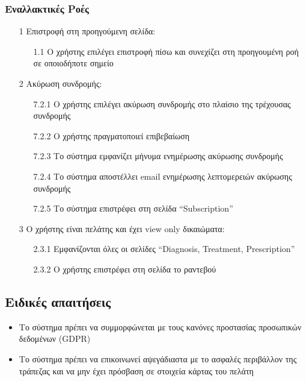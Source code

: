 \documentclass[12pt,a4paper,twoside]{book}
\begin{document}
\subsubsection{Εναλλακτικές Ροές}
\begin{enumerate}
  \item[1 ] Επιστροφή στη προηγούμενη σελίδα:   %
        \begin{enumerate}
          \item[1.1 ] Ο χρήστης επιλέγει επιστροφή πίσω και συνεχίζει στη προηγουμένη ροή σε οποιοδήποτε σημείο %
        \end{enumerate}
  \item[2 ] Ακύρωση συνδρομής:   %
        \begin{enumerate}
          \item[7.2.1 ] Ο χρήστης επιλέγει ακύρωση συνδρομής στο πλαίσιο της τρέχουσας συνδρομής  %
          \item[7.2.2 ] Ο χρήστης πραγματοποιεί επιβεβαίωση %
          \item[7.2.3 ] Το σύστημα εμφανίζει μήνυμα ενημέρωσης ακύρωσης συνδρομής  %
          \item[7.2.4 ] Το σύστημα αποστέλλει email ενημέρωσης λεπτομερειών ακύρωσης συνδρομής  %
          \item[7.2.5 ] Το σύστημα επιστρέφει στη σελίδα “Subscription”  %
        \end{enumerate}
  \item[3 ] Ο χρήστης είναι πελάτης και έχει view only δικαιώματα:  %
        \begin{enumerate}
          \item[2.3.1 ] Εμφανίζονται όλες οι σελίδες “Diagnosis, Treatment, Prescription” %
          \item[2.3.2 ] Ο χρήστης επιστρέφει στη σελίδα το ραντεβού  %
        \end{enumerate}
\end{enumerate}

\subsection{Ειδικές απαιτήσεις} %
\begin{itemize}
  \item Το σύστημα πρέπει να συμμορφώνεται με τους κανόνες προστασίας προσωπικών δεδομένων (GDPR)  %
  \item Το σύστημα πρέπει να επικοινωνεί αψεγάδιαστα με το ασφαλές περιβάλλον της τράπεζας και να μην έχει πρόσβαση σε στοιχεία κάρτας του πελάτη   %
\end{itemize}
\end{document}
